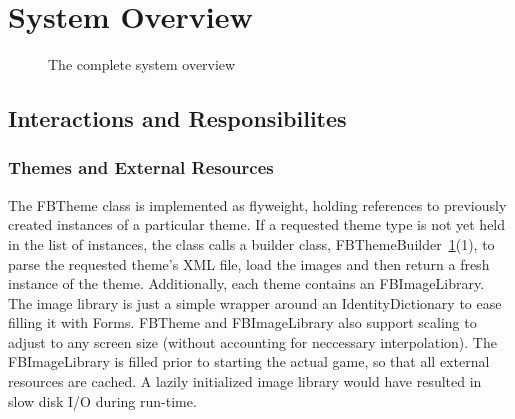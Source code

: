 \section{System Overview}
%
\begin{figure}[bt]
  \begin{center}
  \end{center}
  \caption{The complete system overview}
  \label{fig:system}
\end{figure}
%
\subsection{Interactions and Responsibilites}
\subsubsection{Themes and External Resources}
The FBTheme class is implemented as flyweight, holding references to previously 
created instances of a particular theme. If a requested theme type is not yet 
held in the list of instances, the class calls a builder class, 
FBThemeBuilder~\ref{fig:system}(1), to parse the requested theme's XML file, 
load the images and then return a fresh instance of the theme. Additionally, 
each theme contains an FBImageLibrary. The image library is just a simple 
wrapper around an IdentityDictionary to ease filling it with Forms. 
FBTheme and FBImageLibrary also support scaling to adjust to any screen 
size (without accounting for neccessary interpolation).
The FBImageLibrary is filled prior to starting the actual game, so 
that all external resources are cached. A lazily initialized image 
library would have resulted in slow disk I/O during
run-time.
